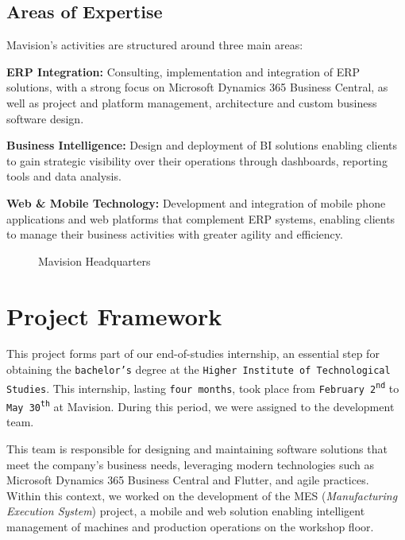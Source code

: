 \subsection{Areas of Expertise}
 
Mavision's activities are structured around three main areas:
 
\textbf{ERP Integration:} Consulting, implementation and integration of ERP solutions,
with a strong focus on Microsoft Dynamics 365 Business Central, as well as project and
platform management, architecture and custom business software design.
 
\textbf{Business Intelligence:} Design and deployment of BI solutions enabling clients
to gain strategic visibility over their operations through dashboards, reporting tools
and data analysis.
 
\textbf{Web \& Mobile Technology:} Development and integration of mobile phone
applications and web platforms that complement ERP systems, enabling clients to manage
their business activities with greater agility and efficiency.

\begin{figure}[H]
	\centering
	\caption{Mavision Headquarters}
	\label{fig:mescha-siege_mavision}
\end{figure}

\section{Project Framework}

This project forms part of our end-of-studies internship, an essential step for
obtaining the \texttt{bachelor's} degree at the
\texttt{Higher Institute of Technological Studies}.
This internship, lasting \texttt{four months}, took place from
\texttt{February 2\textsuperscript{nd}} to \texttt{May 30\textsuperscript{th}} at Mavision. During
this period, we were assigned to the development team.

This team is responsible for designing and maintaining software solutions that meet
the company's business needs, leveraging modern technologies such as Microsoft
Dynamics 365 Business Central and Flutter, and agile practices. Within this context,
we worked on the development of the MES (\textit{Manufacturing Execution System})
project, a mobile and web solution enabling intelligent management of machines and
production operations on the workshop floor.

